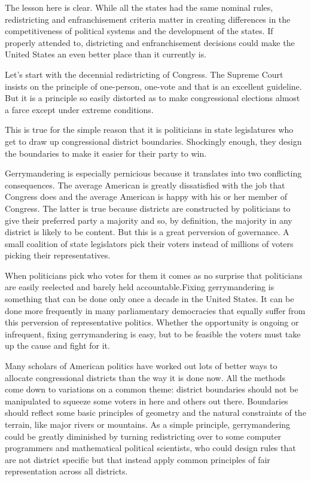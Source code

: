 \documentclass[10pt]{article}
\begin{document}
{\large The lesson here is clear. While all the states had the same nominal
rules, redistricting and enfranchisement criteria matter in creating differences
in the competitiveness of political systems and the development of the states. If
properly attended to, districting and enfranchisement decisions could make the
United States an even better place than it currently is.}

{\large Let's start with the decennial redistricting of Congress. The Supreme
Court insists on the principle of one-person, one-vote and that is an excellent
guideline. But it is a principle so easily distorted as to make congressional
elections almost a farce except under extreme conditions.}

{\large This is true for the simple reason that it is politicians in state
legislatures who get to draw up congressional district boundaries. Shockingly
enough, they design the boundaries to make it easier for their party to win.}

{\large Gerrymandering is especially pernicious because it translates into two
conflicting consequences. The average American is greatly dissatisfied with the
job that Congress does and the average American is happy with his or her member
of Congress. The latter is true because districts are constructed by politicians
to give their preferred party a majority and so, by definition, the majority in
any district is likely to be content. But this is a great perversion of
governance. A small coalition of state legislators pick their voters instead of
millions of voters picking their representatives.}

{\large When politicians pick who votes for them it comes as no surprise that
politicians are easily reelected and barely held accountable.Fixing
gerrymandering is something that can be done only once a decade in the United
States. It can be done more frequently in many parliamentary democracies that
equally suffer from this perversion of representative politics. Whether the
opportunity is ongoing or infrequent, fixing gerrymandering is easy, but to be
feasible the voters must take up the cause and fight for it.}

{\large Many scholars of American politics have worked out lots of better ways
to allocate congressional districts than the way it is done now. All the methods
come down to variations on a common theme: district boundaries should not be
manipulated to squeeze some voters in here and others out there. Boundaries
should reflect some basic principles of geometry and the natural constraints of
the terrain, like major rivers or mountains. As a simple principle,
gerrymandering could be greatly diminished by turning redistricting over to some
computer programmers and mathematical political scientists, who could design
rules that are not district specific but that instead apply common principles of
fair representation across all districts.}
\end{document}
